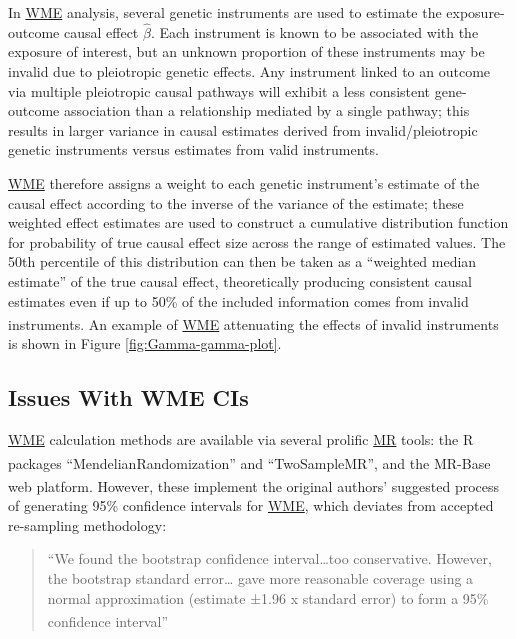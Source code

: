\documentclass[
]{article}
\begin{document}
In \hyperref[acronyms_WME]{WME} analysis, several genetic instruments are used to estimate the exposure-outcome causal effect \(\hat{\beta}\). Each instrument is known to be associated with the exposure of interest, but an unknown proportion of these instruments may be invalid due to pleiotropic genetic effects. Any instrument linked to an outcome via multiple pleiotropic causal pathways will exhibit a less consistent gene-outcome association than a relationship mediated by a single pathway; this results in larger variance in causal estimates derived from invalid/pleiotropic genetic instruments versus estimates from valid instruments.

\hyperref[acronyms_WME]{WME} therefore assigns a weight to each genetic instrument's estimate of the causal effect according to the inverse of the variance of the estimate; these weighted effect estimates are used to construct a cumulative distribution function for probability of true causal effect size across the range of estimated values. The 50th percentile of this distribution can then be taken as a ``weighted median estimate'' of the true causal effect, theoretically producing consistent causal estimates even if up to 50\% of the included information comes from invalid instruments\textsuperscript{}. An example of \hyperref[acronyms_WME]{WME} attenuating the effects of invalid instruments is shown in Figure \ref{fig:Gamma-gamma-plot}.

\subsection{Issues With WME CIs}\label{issues-with-wme-cis}

\hyperref[acronyms_WME]{WME} calculation methods are available via several prolific \hyperref[acronyms_MR]{MR} tools: the R packages ``MendelianRandomization''\textsuperscript{} and ``TwoSampleMR'', and the MR-Base web platform\textsuperscript{}. However, these implement the original authors' suggested process of generating 95\% confidence intervals for \hyperref[acronyms_WME]{WME}, which deviates from accepted re-sampling methodology:

\begin{quote}
``We found the bootstrap confidence interval\ldots too conservative. However, the bootstrap standard error\ldots{} gave more reasonable coverage using a normal approximation (estimate ±1.96 x standard error) to form a 95\% confidence interval''\textsuperscript{}
\end{quote}
\end{document}
